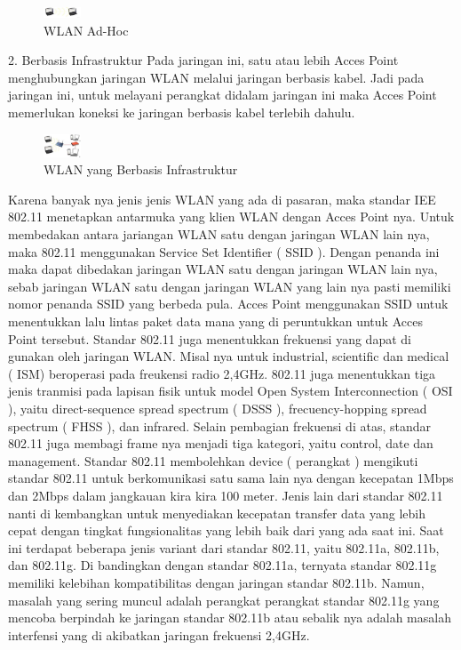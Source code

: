 \begin{figure}[ht]
\centerline{\includegraphics[width=0.1\textwidth]{figures/wlan1.jpg}}
\caption{WLAN Ad-Hoc}
\label{wlan}
\end {figure}

2. Berbasis Infrastruktur
Pada jaringan ini, satu atau lebih Acces Point menghubungkan jaringan WLAN melalui
jaringan berbasis kabel. Jadi pada jaringan ini, untuk melayani perangkat didalam
jaringan ini maka Acces Point memerlukan koneksi ke jaringan berbasis kabel terlebih
dahulu.

\begin{figure}[ht]
\centerline{\includegraphics[width=0.1\textwidth]{figures/wlan-infrastruktur3.jpg}}
\caption{WLAN yang Berbasis Infrastruktur}
\label{wlan-infrastruktur}
\end {figure}

Karena banyak nya jenis jenis WLAN yang ada di pasaran, maka standar IEE 802.11
menetapkan antarmuka yang klien WLAN dengan Acces Point nya. Untuk membedakan
antara jariangan WLAN satu dengan jaringan WLAN lain nya, maka 802.11
menggunakan Service Set Identifier ( SSID ). Dengan penanda ini maka dapat dibedakan
jaringan WLAN satu dengan jaringan WLAN lain nya, sebab jaringan WLAN satu
dengan jaringan WLAN yang lain nya pasti memiliki nomor penanda SSID yang berbeda
pula. Acces Point menggunakan SSID untuk menentukkan lalu lintas paket data mana
yang di peruntukkan untuk Acces Point tersebut.
Standar 802.11 juga menentukkan frekuensi yang dapat di gunakan oleh jaringan WLAN.
Misal nya untuk industrial, scientific dan medical ( ISM) beroperasi pada freukensi radio
2,4GHz. 802.11 juga menentukkan tiga jenis tranmisi pada lapisan fisik untuk model
Open System Interconnection ( OSI ), yaitu direct-sequence spread spectrum ( DSSS ),
frecuency-hopping spread spectrum ( FHSS ), dan infrared. Selain pembagian frekuensi
di atas, standar 802.11 juga membagi frame nya menjadi tiga kategori, yaitu control, date
dan management.
Standar 802.11 membolehkan device ( perangkat ) mengikuti standar 802.11 untuk
berkomunikasi satu sama lain nya dengan kecepatan 1Mbps dan 2Mbps dalam jangkauan
kira kira 100 meter. Jenis lain dari standar 802.11 nanti di kembangkan untuk
menyediakan kecepatan transfer data yang lebih cepat dengan tingkat fungsionalitas yang
lebih baik dari yang ada saat ini. Saat ini terdapat beberapa jenis variant dari standar
802.11, yaitu 802.11a, 802.11b, dan 802.11g.
Di bandingkan dengan standar 802.11a, ternyata standar 802.11g memiliki kelebihan
kompatibilitas dengan jaringan standar 802.11b. Namun, masalah yang sering muncul
adalah perangkat perangkat standar 802.11g yang mencoba berpindah ke jaringan standar
802.11b atau sebalik nya adalah masalah interfensi yang di akibatkan jaringan frekuensi
2,4GHz.


